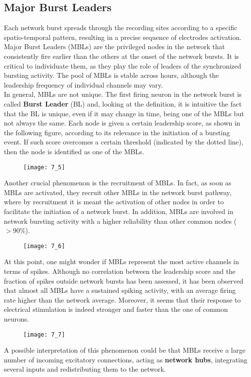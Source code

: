 \subsection{Major Burst Leaders}
Each network burst spreads through the recording sites according to a specific
spatio-temporal pattern, resulting in a precise sequence of electrodes activation.
Major Burst Leaders (MBLs) are the privileged nodes in the network that consistently
fire earlier than the others at the onset of the network bursts. It is critical to
individuate them, as they play the role of leaders of the synchronized bursting
activity. The pool of MBLs is stable across hours, although the leadership frequency of individual channels may vary.\\
In general, MBLs are not unique. The first firing neuron in the network burst is called \textbf{Burst Leader} (BL) and, looking at the definition, 
it is intuitive the fact that the BL is unique, even if it may change in time, being one of the MBLs but not always the same.
\newpage
Each node is given a certain leadership score, as shown in the following figure, according
to its relevance in the initiation of a bursting event. If such score overcomes a
certain threshold (indicated by the dotted line), then the node is identified as
one of the MBLs.
\begin{figure}[H]
    \texttt{[image: 7\_5]}
    \centering
\end{figure}
Another crucial phenomenon is the recruitment of MBLs. In fact,
as soon as MBLs are activated, they recruit other MBLs in the network burst pathway, where by recruitment it is meant
the activation of other nodes in order to facilitate the initiation of a network burst.
In addition, MBLs are involved in network bursting activity with a higher reliability
than other common nodes (\(>90\%\)).
\begin{figure}[H]
    \texttt{[image: 7\_6]}
    \centering
\end{figure}
At this point, one might wonder if MBLs represent the most active channels in terms
of spikes. Although no correlation between the leadership score and the fraction of
spikes outside network bursts has been assessed, it has been observed that almost
all MBLs have a sustained spiking activity, with an average firing rate higher than
the network average. Moreover, it seems that their response to electrical stimulation
is indeed stronger and faster than the one of common neurons.
\begin{figure}[H]
    \texttt{[image: 7\_7]}
    \centering
\end{figure}
A possible interpretation of this phenomenon could be that MBLs receive a large number
of incoming excitatory connections, acting as \textbf{network hubs}, integrating
several inputs and redistributing them to the network.